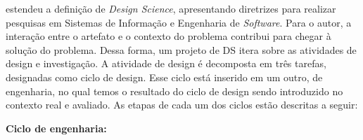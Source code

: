 
\citet{wieringa2014design} estendeu a definição de \textit{Design Science}, apresentando diretrizes para realizar pesquisas em Sistemas de Informação e Engenharia de \textit{Software}. Para o autor, a interação entre o artefato e o contexto do problema contribui para chegar à solução do problema. Dessa forma, um projeto de DS itera sobre as atividades de design e investigação. A atividade de design é decomposta em três tarefas, designadas como ciclo de design. Esse ciclo está inserido em um outro, de engenharia, no qual temos o resultado do ciclo de design sendo introduzido no contexto real e avaliado. As etapas de cada um dos ciclos estão descritas a seguir:

\noindent \textbf{Ciclo de engenharia:}

